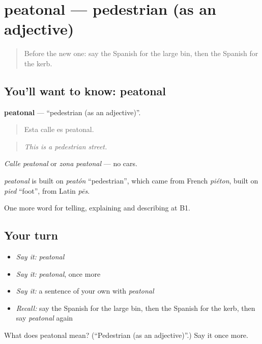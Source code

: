 \section[peatonal]{peatonal — pedestrian (as an adjective)}

\label{lesson:ES-C682-peatonal}



\begin{quote}
Before the new one: say the Spanish for the large bin, then the Spanish for the kerb.
\end{quote}

\subsection*{You'll want to know: peatonal}
\textbf{peatonal} — \textquotedblleft{}pedestrian (as an adjective)\textquotedblright{}.

\begin{quote}
Esta calle es peatonal.
\end{quote}

\begin{quote}
\emph{This is a pedestrian street.}
\end{quote}

\emph{Calle peatonal} or \emph{zona peatonal} — no cars.

\begin{cousinweb}
\emph{peatonal} is built on \emph{peatón} \textquotedblleft{}pedestrian\textquotedblright{}, which came from French \emph{piéton}, built on \emph{pied} \textquotedblleft{}foot\textquotedblright{}, from Latin \emph{pēs}.
\end{cousinweb}

\begin{grammarlens}[title={What you've built}]
One more word for telling, explaining and describing at B1.
\end{grammarlens}

\subsection*{Your turn}
\begin{itemize}
\raggedright
  \item \emph{Say it:} \emph{peatonal}
  \item \emph{Say it:} \emph{peatonal}, once more
  \item \emph{Say it:} a sentence of your own with \emph{peatonal}
  \item \emph{Recall:} say the Spanish for the large bin, then the Spanish for the kerb, then say \emph{peatonal} again
\end{itemize}

\begin{tcolorbox}[breakable,colback=teal!4,colframe=teal!35!black,title={Before you move on}]
What does peatonal mean? (\textquotedblleft{}Pedestrian (as an adjective)\textquotedblright{}.) Say it once more.
\end{tcolorbox}
